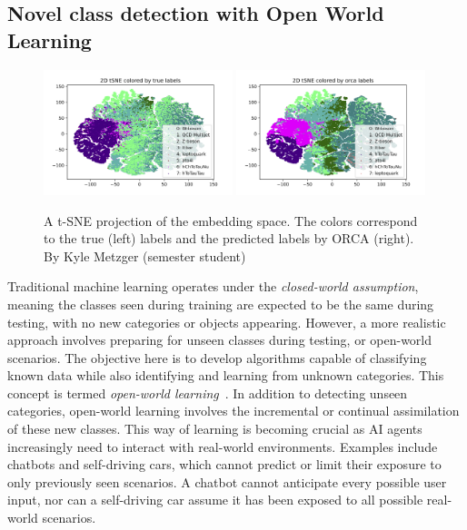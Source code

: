 \documentclass[12pt]{iopart}
\begin{document}
\subsection{Novel class detection with Open World Learning}
\begin{figure}[ht]
    \centering
    \includegraphics[width=0.49\textwidth]{figures/tSNE_2D_true_labels_10.png}
     \includegraphics[width=0.49\textwidth]{figures/tSNE_2D_orca_pred_labels_10.png}
    \caption{A t-SNE projection of the embedding space. The colors correspond to the true (left) labels and the predicted labels by ORCA (right). By Kyle Metzger (semester student) }
    \label{fig:orca}
\end{figure}
Traditional machine learning operates under the \textit{closed-world assumption}, meaning the classes seen during training are expected to be the same during testing, with no new categories or objects appearing. However, a more realistic approach involves preparing for unseen classes during testing, or open-world scenarios. The objective here is to develop algorithms capable of classifying known data while also identifying and learning from unknown categories. This concept is termed \textit{open-world learning}~\cite{DBLP:journals/corr/abs-2102-03526}. In addition to detecting unseen categories, open-world learning involves the incremental or continual assimilation of these new classes. This way of learning is becoming crucial as AI agents increasingly need to interact with real-world environments. Examples include chatbots and self-driving cars, which cannot predict or limit their exposure to only previously seen scenarios. A chatbot cannot anticipate every possible user input, nor can a self-driving car assume it has been exposed to all possible real-world scenarios.
\end{document}
